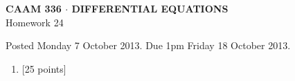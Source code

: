 \documentclass[10pt]{article}
\begin{document}
\vspace*{-5em}
\begin{center}
\large \textsf{\textbf{CAAM 336 $\cdot$ DIFFERENTIAL EQUATIONS}\\[0.5em]
Homework 24 }
\end{center}

Posted Monday 7 October 2013.  Due 1pm Friday 18 October 2013.

\begin{enumerate}\addtocounter{enumi}{23}
\item {[25 points]}  
\end{enumerate}
\end{document}
